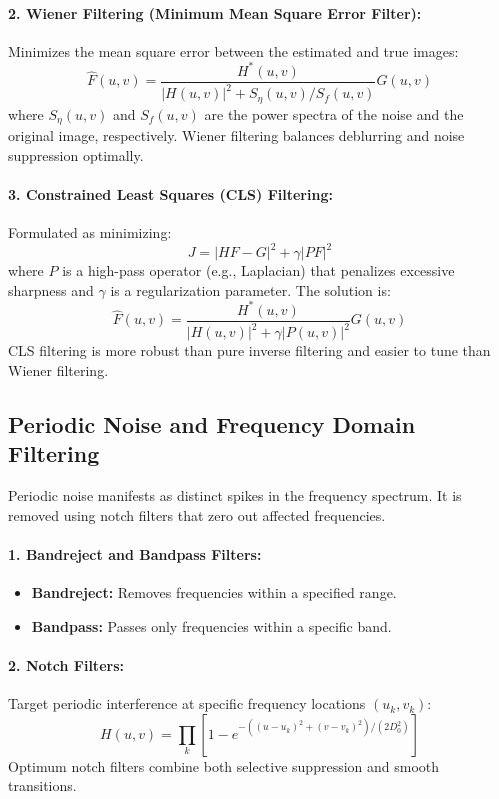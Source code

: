 \documentclass[12pt,a4paper]{AnantDocumentation}
\begin{document}
\paragraph{2. Wiener Filtering (Minimum Mean Square Error Filter):}
Minimizes the mean square error between the estimated and true images:
\begin{equation}
\hat{F}(u,v) = \frac{H^*(u,v)}{|H(u,v)|^2 + S_\eta(u,v)/S_f(u,v)} G(u,v)
\end{equation}
where $S_\eta(u,v)$ and $S_f(u,v)$ are the power spectra of the noise and the original image, respectively. Wiener filtering balances deblurring and noise suppression optimally.

\paragraph{3. Constrained Least Squares (CLS) Filtering:}
Formulated as minimizing:
\begin{equation}
J = | H F - G |^2 + \gamma | P F |^2
\end{equation}
where $P$ is a high-pass operator (e.g., Laplacian) that penalizes excessive sharpness and $\gamma$ is a regularization parameter. The solution is:
\begin{equation}
\hat{F}(u,v) = \frac{H^*(u,v)}{|H(u,v)|^2 + \gamma |P(u,v)|^2} G(u,v)
\end{equation}
CLS filtering is more robust than pure inverse filtering and easier to tune than Wiener filtering.

\subsection{Periodic Noise and Frequency Domain Filtering}
Periodic noise manifests as distinct spikes in the frequency spectrum. It is removed using notch filters that zero out affected frequencies.

\paragraph{1. Bandreject and Bandpass Filters:}
\begin{itemize}
\item \textbf{Bandreject:} Removes frequencies within a specified range.
\item \textbf{Bandpass:} Passes only frequencies within a specific band.
\end{itemize}

\paragraph{2. Notch Filters:}
Target periodic interference at specific frequency locations $(u_k, v_k)$:
\begin{equation}
H(u,v) = \prod_k [1 - e^{-((u-u_k)^2 + (v-v_k)^2)/(2D_0^2)}]
\end{equation}
Optimum notch filters combine both selective suppression and smooth transitions.
\end{document}
